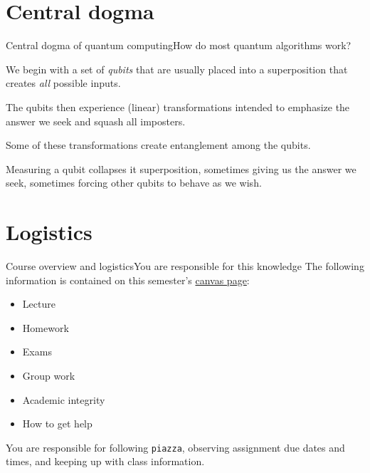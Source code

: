 \section*{Central dogma}

\begin{frame}{Central dogma of quantum computing}{How do most quantum algorithms work?}
\begin{description}
    \item<1->[Input] We begin with a set of \emph{qubits} that are usually placed into a superposition that creates \emph{all} possible inputs. 
    \item<2->[Gates] The qubits then experience (linear) transformations intended to emphasize the answer we seek and squash all imposters.  
    
    Some of these transformations create entanglement among the qubits.
    \item<3->[Measurement] Measuring a qubit collapses it superposition, sometimes giving us the answer we seek, sometimes forcing other qubits to behave as we wish.
\end{description}
    
\end{frame}



\section{Logistics}

\begin{frame}{Course overview and logistics}{You are responsible for this knowledge}
The following information is contained on this semester's \href{\CourseWebPage}{canvas page}:
\begin{itemize}
    \item Lecture
    \item Homework
    \item Exams
    \item Group work
    \item Academic integrity
    \item How to get help
\end{itemize}
You are responsible for following \texttt{piazza}, observing assignment due dates and times, and keeping up with class information.
\end{frame}

